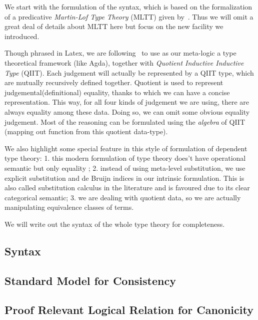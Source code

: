 
We start with the formulation of the syntax, which is based on the formalization of a predicative \textit{Martin-Lof Type Theory} (MLTT) given by~\citet{coquand2018canonicity}. Thus we will omit a great deal of details about MLTT here but focus on the new facility we introduced. 

Though phrased in Latex, we are following~\citet{altkap2016} to use as
our meta-logic a type theoretical framework (like Agda), 
together with \textit{Quotient Inductive Inductive Type} (QIIT). Each
judgement will actually be represented by a QIIT type, which are
mutually recursively defined together. Quotient is used to represent
judgemental(definitional) equality, thanks to which we can have a
concise representation. This way, for all four kinds of judgement we are
using, there are always equality among these data. Doing so, we can omit
some obvious equality judgement. Most of the reasoning can be formulated
using the \textit{algebra} of QIIT (mapping out function from this
quotient data-type). 

We also highlight some special feature in this style of formulation of dependent type theory: 1. this modern formulation of type theory does't have operational semantic but only equality 
;
2. instead of using meta-level substitution, we use explicit substitution and de Bruijn indices in our intrinsic formulation. This is also called substitution calculus in the literature and is favoured due to its clear categorical semantic; 
3. we are dealing with quotient data, so we are actually manipulating equivalence classes of terms. 

We will write out the syntax of the whole type theory for completeness.






\subsection{Syntax}





\subsection{Standard Model for Consistency}




\subsection{Proof Relevant Logical Relation for Canonicity}

